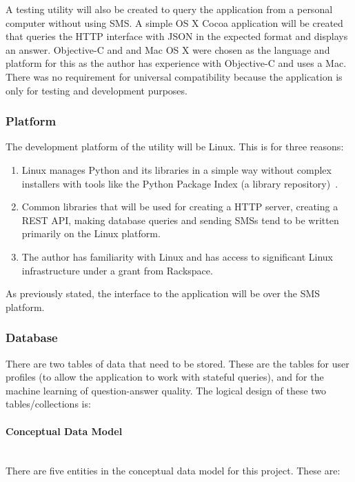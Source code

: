 \documentclass{article}
\newcommand{\myparagraph}[1]{\paragraph{#1}\mbox{}\\}
\begin{document}
A testing utility will also be created to query the application from a personal computer without using SMS.  A simple OS X Cocoa application will be created that queries the HTTP interface with JSON in the expected format and displays an answer.  Objective-C and and Mac OS X were chosen as the language and platform for this as the author has experience with Objective-C and uses a Mac.  There was no requirement for universal compatibility because the application is only for testing and development purposes.

\subsubsection{Platform}
The development platform of the utility will be Linux.  This is for three reasons:
\begin{enumerate}
  \item Linux manages Python and its libraries in a simple way without complex installers with tools like the Python Package Index (a library repository)~\cite{pypi}.
  \item Common libraries that will be used for creating a HTTP server, creating a REST API, making database queries and sending SMSs tend to be written primarily on the Linux platform.
  \item The author has familiarity with Linux and has access to significant Linux infrastructure under a grant from Rackspace.
\end{enumerate}

As previously stated, the interface to the application will be over the SMS platform.

\subsubsection{Database}
There are two tables of data that need to be stored.  These are the tables for user profiles (to allow the application to work with stateful queries), and for the machine learning of question-answer quality.  The logical design of these two tables/collections is:

\myparagraph{Conceptual Data Model}
There are five entities in the conceptual data model for this project.  These are:
\end{document}

